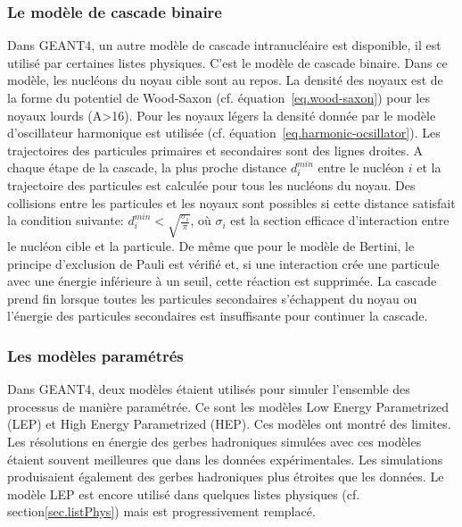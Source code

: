 \subsubsection{Le modèle de cascade binaire}
Dans GEANT4, un autre modèle de cascade intranucléaire est disponible, il est utilisé par certaines listes physiques. C'est le modèle de cascade binaire. Dans ce modèle, les nucléons du noyau cible sont au repos. La densité des noyaux est de la forme du potentiel de Wood-Saxon (cf. équation~\ref{eq.wood-saxon}) pour les noyaux lourds (A>16). Pour les noyaux légers la densité donnée par le modèle d'oscillateur harmonique est utilisée (cf. équation~\ref{eq.harmonic-ocsillator}). Les trajectoires des particules primaires et secondaires sont des lignes droites. A chaque étape de la cascade, la plus proche distance $d_i^{min}$ entre le nucléon $i$ et la trajectoire des particules est calculée pour tous les nucléons du noyau. Des collisions entre les particules et les noyaux sont possibles si cette distance satisfait la condition suivante: $d_i^{min}<\sqrt{\frac{\sigma_i}{\pi}}$, où $\sigma_i$ est la section efficace d'interaction entre le nucléon cible et la particule. De même que pour le modèle de Bertini, le principe d'exclusion de Pauli est vérifié et, si une interaction crée une particule avec une énergie inférieure à un seuil, cette réaction est supprimée. La cascade prend fin lorsque toutes les particules secondaires s'échappent du noyau ou l'énergie des particules secondaires est insuffisante pour continuer la cascade.

\subsubsection{Les modèles paramétrés}
Dans GEANT4, deux modèles étaient utilisés pour simuler l'ensemble des processus de manière paramétrée. Ce sont les modèles Low Energy Parametrized (LEP) et High Energy Parametrized (HEP). Ces modèles ont montré des limites. Les résolutions en énergie des gerbes hadroniques simulées avec ces modèles étaient souvent meilleures que dans les données expérimentales. Les simulations produisaient également des gerbes hadroniques plus étroites que les données. Le modèle LEP est encore utilisé dans quelques listes physiques (cf. section\ref{sec.listPhys}) mais est progressivement remplacé.

